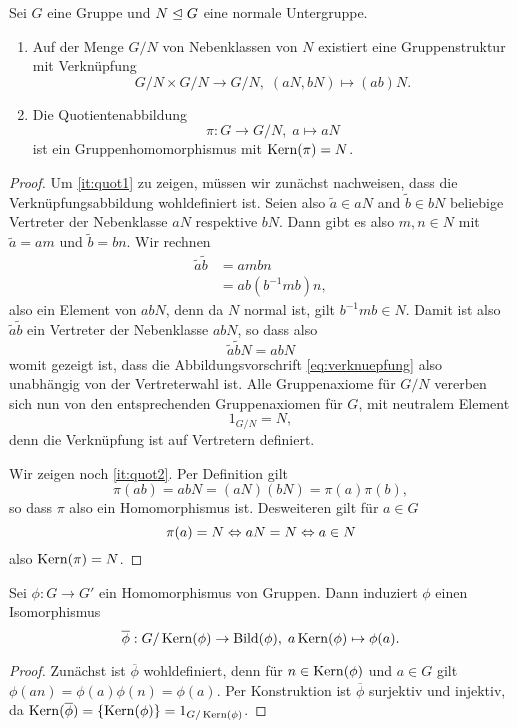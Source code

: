 \documentclass{book}
\begin{document}
\begin{prop}
    \label{prop:quotientengruppe}
    Sei $G$ eine Gruppe und $N \trianglelefteq G$ eine normale Untergruppe. 
    \begin{enumerate}
        \item\label{it:quot1} Auf der Menge $G/N$ von Nebenklassen von $N$ existiert eine Gruppenstruktur mit Verknüpfung
            \begin{equation}\label{eq:verknuepfung}
                G/N \times G/N \to G/N, \; (aN,bN) \mapsto (ab)N.
            \end{equation}
        \item\label{it:quot2} Die Quotientenabbildung
            \[
                \pi: G \to G/N,\; a \mapsto aN
            \]
            ist ein Gruppenhomomorphismus mit $\operatorname{Kern}(\pi) = N$. 
    \end{enumerate}
\end{prop}
\begin{proof}
    Um \ref{it:quot1} zu zeigen, müssen wir zunächst nachweisen, dass die
    Verknüpfungsabbildung wohldefiniert ist. Seien also $\tilde{a} \in aN$ and
    $\tilde{b} \in bN$ beliebige Vertreter der Nebenklasse $aN$ respektive
    $bN$. Dann gibt es also $m,n \in N$ mit $\tilde{a} = am$ und $\tilde{b} = bn$. Wir rechnen
    \begin{align*}
        \tilde{a} \tilde{b} & = am bn\\
                            & = ab (b^{-1} m b) n,
    \end{align*}
    also ein Element von $ab N$, denn da $N$ normal ist, gilt $b^{-1} m b \in
    N$. Damit ist also $\tilde{a} \tilde{b}$ ein Vertreter der Nebenklasse $ab
    N$, so dass also 
    \[
        \tilde{a} \tilde{b} N = ab N
    \]
    womit gezeigt ist, dass die Abbildungsvorschrift \eqref{eq:verknuepfung}
    also unabhängig von der Vertreterwahl ist. Alle Gruppenaxiome für $G/N$
    vererben sich nun von den entsprechenden Gruppenaxiomen für $G$, mit neutralem Element
    \[
        1_{G/N} = N,
    \]
    denn die Verknüpfung ist auf Vertretern definiert. 

    Wir zeigen noch \ref{it:quot2}. Per Definition gilt
    \[
        \pi(ab) = ab N = (aN)(bN) = \pi(a) \pi(b),
    \]
    so dass $\pi$ also ein Homomorphismus ist. Desweiteren gilt für $a \in G$
    \[
        \pi(a) = N \Leftrightarrow a N = N \Leftrightarrow a \in N 
    \]
    also $\operatorname{Kern}(\pi) = N$. 
\end{proof}

\begin{thm}[Homomorphiesatz]
    \label{thm:homsatz} 
    Sei $\phi: G \to G'$ ein Homomorphismus von Gruppen. Dann induziert $\phi$ einen Isomorphismus 
    \[
        \overline{\phi}: G / \Kern(\phi) \to \Bild(\phi),\; a \Kern(\phi) \mapsto \phi(a).
    \]
\end{thm}
\begin{proof}
    Zunächst ist $\overline{\phi}$ wohldefiniert, denn für $n \in \Kern(\phi)$
    und $a \in G$ gilt $\phi(an) = \phi(a) \phi(n) = \phi(a)$. Per Konstruktion
    ist $\overline{\phi}$ surjektiv und injektiv, da $\Kern(\overline{\phi}) =
    \{\Kern(\phi)\} = 1_{G/\Kern(\phi)}$. 
\end{proof}
\end{document}
